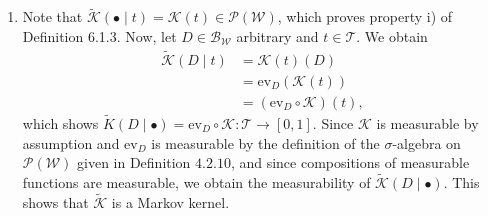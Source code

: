 \begin{gradedsolution}
\begin{enumerate}
\begin{enumerate}
      \item Note that $\widetilde{\mathcal{K}}(\bullet \mid t) = \mathcal{K}(t) \in \mathcal{P}(\mathcal{W})$, which proves property i) of Definition 6.1.3.
      Now, let $D \in \mathcal{B}_{\mathcal{W}}$ arbitrary and $t \in \mathcal{T}$.
      We obtain
      \begin{align*}
	\widetilde{\mathcal{K}}(D \mid t) & = \mathcal{K}(t)(D) \\
	& = \text{ev}_D(\mathcal{K}(t)) \\
	& = (\text{ev}_D \circ \mathcal{K})(t),
      \end{align*}
      which shows $\widetilde{K}(D \mid \bullet) = \text{ev}_D \circ \mathcal{K}: \mathcal{T} \to [0,1]$.
      Since $\mathcal{K}$ is measurable by assumption and $\text{ev}_D$ is measurable by the definition of the $\sigma$-algebra on $\mathcal{P}(\mathcal{W})$ given in Definition $4.2.10$, and since compositions of measurable functions are measurable, we obtain the measurability of $\widetilde{\mathcal{K}}(D \mid \bullet)$.
      This shows that $\widetilde{\mathcal{K}}$ is a Markov kernel.
	\end{enumerate}
    \end{enumerate}
\end{gradedsolution}




